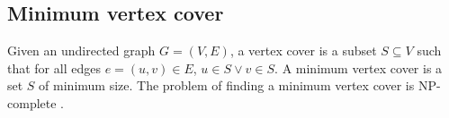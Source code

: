\subsection{Minimum vertex cover}
Given an undirected graph $G = (V,E)$, a vertex cover is a subset $S \subseteq V$ such that for all edges $e = (u,v) \in E$, $ u \in S \vee v \in S$. A minimum vertex cover is a set $S$ of minimum size. The problem of finding a minimum vertex cover is NP-complete \cite{Kar72}.